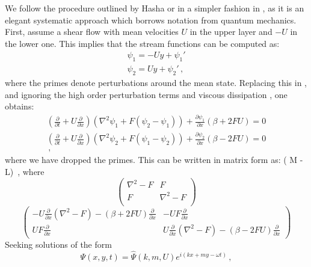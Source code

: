 We follow the procedure outlined by Hasha or in a simpler
fashion in , as it is an elegant systematic approach
which borrows notation from quantum mechanics. First, assume a shear flow
with mean velocities $U$ in the upper layer and $-U$ in the lower one.
This implies that the stream functions can be computed as:
\begin{eqnarray}
\psi_1 = -U y + \psi_1' \nonumber \\
\psi_2 =  U y + \psi_2'
\label{psi_base}
\,,
\end{eqnarray}
where the primes denote perturbations around the mean state. Replacing this in , and ignoring the high order perturbation terms and viscous dissipation , one obtains:
\begin{eqnarray}
\left(\frac{\partial}{\partial t}+U \frac{\partial}{\partial x}\right)\left(\nabla^2 \psi_1 + F(\psi_2-\psi_1)\right) +\frac{\partial \psi_1}{\partial x}(\beta + 2FU) = 0 \nonumber \\
\left(\frac{\partial}{\partial t}+U \frac{\partial}{\partial x}\right)\left(\nabla^2 \psi_2 + F(\psi_1-\psi_2)\right) +\frac{\partial \psi_2}{\partial x}(\beta - 2FU) = 0 \nonumber \\
\,,
\end{eqnarray}
where we have dropped the primes. This can be written in matrix form as:
\beq
\left( M - L\right) 
\,,
where
\begin{equation}
\begin{pmatrix}
  \nabla ^2 - F & F \\
  F & \nabla^2 - F \\
\end{pmatrix}
\label{Mmatrix}
\end{equation}
\begin{equation}
\begin{pmatrix}
  -U \frac{\partial}{\partial x}(\nabla ^2-F)-(\beta+2FU)\frac{\partial}{\partial x}
   & -U F \frac{\partial}{\partial x} \\
   U F \frac{\partial}{\partial x}
   & U \frac{\partial}{\partial x}(\nabla ^2-F)-(\beta-2FU)\frac{\partial}{\partial x}
\end{pmatrix}
\label{Mmatrix2}
\end{equation}
Seeking solutions of the form
\begin{equation}
\Psi (x,y,t)=\hat{\Psi} (k,m,U) e^{i(kx+my-\omega t)}
\,,
\label{PRT}
\end{equation}
